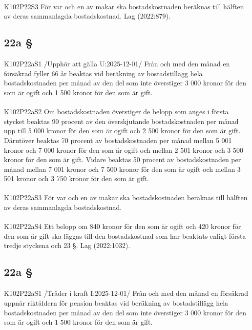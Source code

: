 \documentclass[a4paper,notitlepage,openany,10pt]{book}
\begin{document}
\paragraph*{}
{\tiny K102P22S3}
För var och en av makar ska bostadskostnaden beräknas till hälften av deras sammanlagda bostadskostnad.
Lag (2022:879).
\subsection*{22a §}
\paragraph*{}
{\tiny K102P22aS1}
/Upphör att gälla U:2025-12-01/
Från och med den månad en försäkrad fyller 66 år beaktas vid beräkning av bostadstillägg hela bostadskostnaden per månad av den del som inte överstiger 3 000 kronor för den som är ogift och 1 500 kronor för den som är gift.
\paragraph*{}
{\tiny K102P22aS2}
Om bostadskostnaden överstiger de belopp som anges i första stycket beaktas 90 procent av den överskjutande bostadskostnaden per månad upp till 5 000 kronor för den som är ogift och 2 500 kronor för den som är gift. Därutöver beaktas 70 procent av bostadskostnaden per månad mellan 5 001 kronor och 7 000 kronor för den som är ogift och mellan 2 501 kronor och 3 500 kronor för den som är gift. Vidare beaktas 50 procent av bostadskostnaden per månad mellan 7 001 kronor och 7 500 kronor för den som är ogift och mellan 3 501 kronor och 3 750 kronor för den som är gift.
\paragraph*{}
{\tiny K102P22aS3}
För var och en av makar ska bostadskostnaden beräknas till hälften av deras sammanlagda bostadskostnad.
\paragraph*{}
{\tiny K102P22aS4}
Ett belopp om 840 kronor för den som är ogift och 420 kronor för den som är gift ska läggas till den bostadskostnad som har beaktats enligt första-tredje styckena och 23 §.
Lag (2022:1032).
\subsection*{22a §}
\paragraph*{}
{\tiny K102P22aS1}
/Träder i kraft I:2025-12-01/
Från och med den månad en försäkrad uppnår riktåldern för pension beaktas vid beräkning av bostadstillägg hela bostadskostnaden per månad av den del som inte överstiger 3 000 kronor för den som är ogift och 1 500 kronor för den som är gift.
\end{document}
